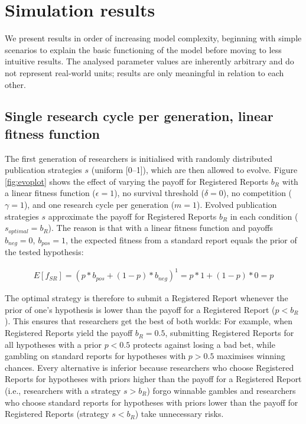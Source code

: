 \documentclass[
  british,
  a4paper,
  ,man,mask,floatsintext]{apa6}
\begin{document}
\section{Simulation results}\label{simulation-results}

We present results in order of increasing model complexity, beginning with simple scenarios to explain the basic functioning of the model before moving to less intuitive results.
The analysed parameter values are inherently arbitrary and do not represent real-world units; results are only meaningful in relation to each other.

\subsection{Single research cycle per generation, linear fitness function}\label{single-research-cycle-per-generation-linear-fitness-function}

The first generation of researchers is initialised with randomly distributed publication strategies \(s\) (uniform {[}0--1{]}), which are then allowed to evolve.
Figure \ref{fig:evoplot} shows the effect of varying the payoff for Registered Reports \(b_{R}\) with a linear fitness function (\(\epsilon = 1\)), no survival threshold (\(\delta = 0\)), no competition (\(\gamma = 1\)), and one research cycle per generation (\(m = 1\)).
Evolved publication strategies \(s\) approximate the payoff for Registered Reports \(b_{R}\) in each condition (\(s_{optimal} = b_{R}\)).
The reason is that with a linear fitness function and payoffs \(b_{neg} = 0\), \(b_{pos} = 1\), the expected fitness from a standard report equals the prior of the tested hypothesis:

\begin{align}
E[f_{SR}] = (p * b_{pos} + (1-p) * b_{neg})^1 = p * 1 +  (1-p) * 0 = p
\end{align}

The optimal strategy is therefore to submit a Registered Report whenever
the prior of one's hypothesis is lower than the payoff for a Registered Report (\(p < b_{R}\)).
This ensures that researchers get the best of both worlds:
For example, when Registered Reports yield the payoff \(b_{R} = 0.5\), submitting Registered Reports for all hypotheses with a prior \(p < 0.5\) protects against losing a bad bet, while gambling on standard reports for hypotheses with \(p > 0.5\) maximises winning chances.
Every alternative is inferior because researchers who choose Registered Reports for hypotheses with priors higher than the payoff for a Registered Report (i.e., researchers with a strategy \(s > b_{R}\)) forgo winnable gambles and researchers who choose standard reports for hypotheses with priors lower than the payoff for Registered Reports (strategy \(s < b_{R}\)) take unnecessary risks.
\end{document}
